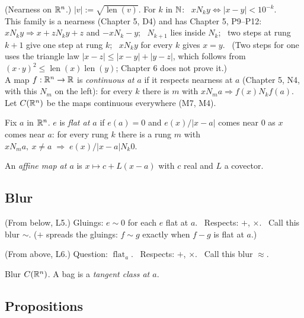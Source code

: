 \begin{lines}
\item[\lab{D1}] (Nearness on $\mathbb{R}^n$.) $|v| := \sqrt{\operatorname{len}(v)}$. For $k$ in $\mathbb{N}$: \ $x \mathrel{N_k} y \iff |x - y| < 10^{-k}$. \\
This family is a nearness (Chapter 5, D4) and has Chapter 5, P9--P12: \ $x \mathrel{N_k} y \Rightarrow x + z \mathrel{N_k} y + z$ and $-x \mathrel{N_k} -y$; \ $N_{k+1}$ lies inside $N_k$; \ two steps at rung $k + 1$ give one step at rung $k$; \ $x \mathrel{N_k} y$ for every $k$ gives $x = y$. \ (Two steps for one uses the triangle law $|x - z| \le |x - y| + |y - z|$, which follows from $(x \cdot y)^2 \le \operatorname{len}(x)\operatorname{len}(y)$; Chapter 6 does not prove it.) \\
A map $f : \mathbb{R}^n \to \mathbb{R}$ is \emph{continuous at $a$} if it respects nearness at $a$ (Chapter 5, N4, with this $N_m$ on the left): for every $k$ there is $m$ with $x \mathrel{N_m} a \Rightarrow f(x) \mathrel{N_k} f(a)$. Let $C(\mathbb{R}^n)$ be the maps continuous everywhere (M7, M4).
\item[\lab{D2}] Fix $a$ in $\mathbb{R}^n$. $e$ is \emph{flat at $a$} if $e(a) = 0$ and $e(x)/|x - a|$ comes near $0$ as $x$ comes near $a$: for every rung $k$ there is a rung $m$ with \ $x \mathrel{N_m} a,\ x \neq a \;\Rightarrow\; e(x)/|x - a| \mathrel{N_k} 0$.
\item[\lab{D3}] An \emph{affine map at $a$} is $x \mapsto c + L(x - a)$ with $c$ real and $L$ a covector.
\end{lines}

\subsection*{Blur}

\begin{lines}
\item[\lab{B1}] (From below, L5.) Gluings: $e \sim 0$ for each $e$ flat at $a$. \ Respects: $+$, $\times$. \ Call this blur $\sim$. ($+$ spreads the gluings: $f \sim g$ exactly when $f - g$ is flat at $a$.)
\item[\lab{B2}] (From above, L6.) Question: $\operatorname{flat}_a$. \ Respects: $+$, $\times$. \ Call this blur $\approx$.
\item[] Blur $C(\mathbb{R}^n)$. A bag is a \emph{tangent class at $a$}.
\end{lines}

\subsection*{Propositions}

